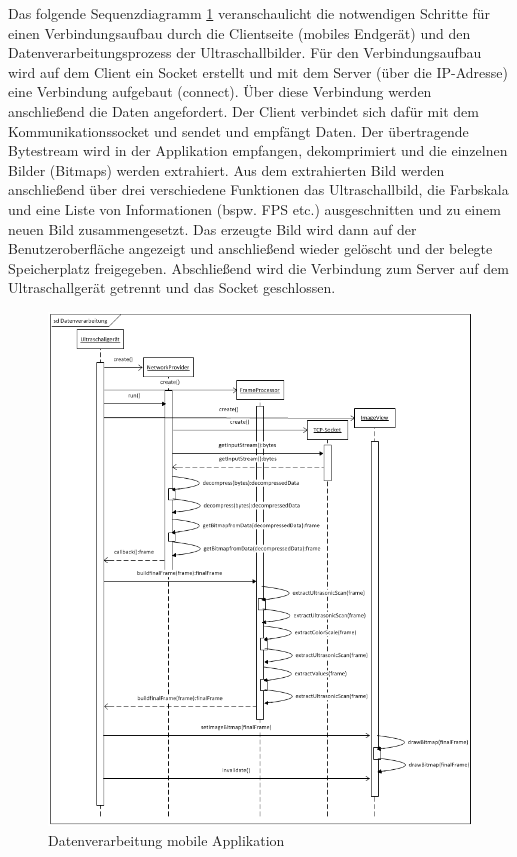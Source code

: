 Das folgende Sequenzdiagramm \ref{fig:SD_Datenverarbeitung} veranschaulicht die notwendigen Schritte für einen Verbindungsaufbau durch die Clientseite (mobiles Endgerät) und den Datenverarbeitungsprozess der Ultraschallbilder. Für den Verbindungsaufbau wird auf dem Client ein Socket erstellt und mit dem Server (über die IP-Adresse) eine Verbindung aufgebaut (connect). Über diese Verbindung werden anschließend die Daten angefordert. Der Client verbindet sich dafür mit dem Kommunikationssocket und sendet und empfängt Daten. Der übertragende Bytestream wird in der Applikation empfangen, dekomprimiert und die einzelnen Bilder (Bitmaps) werden extrahiert. Aus dem extrahierten Bild werden anschließend über drei verschiedene Funktionen das Ultraschallbild, die Farbskala und eine Liste von Informationen (bspw. FPS etc.) ausgeschnitten und zu einem neuen Bild zusammengesetzt. Das erzeugte Bild wird dann auf der Benutzeroberfläche angezeigt und anschließend wieder gelöscht und der belegte Speicherplatz freigegeben. Abschließend wird die Verbindung zum Server auf dem Ultraschallgerät getrennt und das Socket geschlossen.

\begin{figure}[H] 
\centering
\includegraphics[width=1\textwidth]{Bilder/objektorientierteAnalyseundEntwurf/SD_Datenverarbeitung}
\caption{{\small Datenverarbeitung mobile Applikation}}
\label{fig:SD_Datenverarbeitung}
\end{figure}

